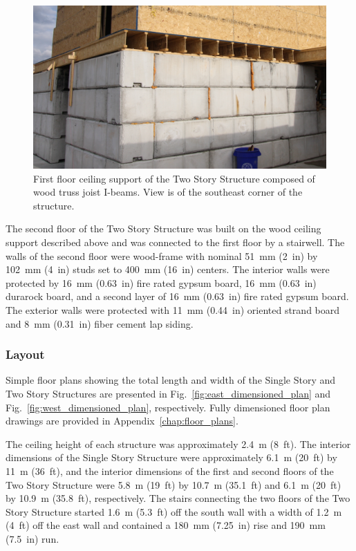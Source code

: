 \documentclass[12pt,oneside]{book}
\begin{document}
\begin{figure}[!ht]
	\includegraphics[width=\columnwidth]{../Figures/Pictures/TJI_support}
	\caption[TJI-constructed ceiling support of the Two Story Structure.]{First floor ceiling support of the Two Story Structure composed of wood truss joist I-beams. View is of the southeast corner of the structure.}
	\label{fig:TJI}
\end{figure}
\FloatBarrier

The second floor of the Two Story Structure was built on the wood ceiling support described above and was connected to the first floor by a stairwell. The walls of the second floor were wood-frame with nominal 51~mm (2~in) by 102~mm (4~in) studs set to 400~mm (16~in) centers. The interior walls were protected by 16~mm (0.63~in) fire rated gypsum board, 16~mm (0.63~in) durarock board, and a second layer of 16~mm (0.63~in) fire rated gypsum board. The exterior walls were protected with 11~mm (0.44~in) oriented strand board and 8~mm (0.31~in) fiber cement lap siding.

\subsubsection{Layout}
\label{sec:layout}
Simple floor plans showing the total length and width of the Single Story and Two Story Structures are presented in Fig.~\ref{fig:east_dimensioned_plan} and Fig.~\ref{fig:west_dimensioned_plan}, respectively. Fully dimensioned floor plan drawings are provided in Appendix~\ref{chap:floor_plans}.

The ceiling height of each structure was approximately 2.4~m (8~ft). The interior dimensions of the Single Story Structure were approximately 6.1~m (20~ft) by 11~m (36~ft), and the interior dimensions of the first and second floors of the Two Story Structure were 5.8~m (19~ft) by 10.7~m (35.1~ft) and 6.1~m (20~ft) by 10.9~m (35.8~ft), respectively. The stairs connecting the two floors of the Two Story Structure started 1.6~m (5.3~ft) off the south wall with a width of 1.2~m (4~ft) off the east wall and contained a 180~mm (7.25~in) rise and 190~mm (7.5~in) run.
\end{document}
